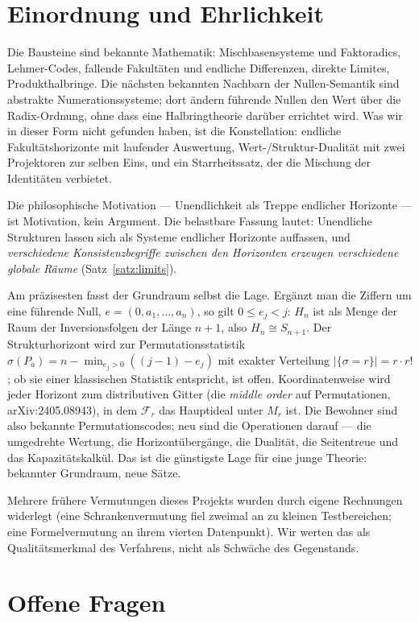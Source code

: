 \documentclass[11pt]{article}
\theoremstyle{definition}
\theoremstyle{remark}
\begin{document}
\section{Einordnung und Ehrlichkeit}

Die Bausteine sind bekannte Mathematik: Mischbasensysteme und
Faktoradics, Lehmer-Codes, fallende Fakultäten und endliche
Differenzen, direkte Limites, Produkthalbringe. Die nächsten
bekannten Nachbarn der Nullen-Semantik sind abstrakte
Numerationssysteme; dort ändern führende Nullen den Wert über die
Radix-Ordnung, ohne dass eine Halbringtheorie darüber errichtet
wird. Was wir in dieser Form nicht gefunden haben, ist die
Konstellation: endliche Fakultätshorizonte mit laufender Auswertung,
Wert-/Struktur-Dualität mit zwei Projektoren zur selben Eins, und
ein Starrheitssatz, der die Mischung der Identitäten verbietet.

Die philosophische Motivation --- Unendlichkeit als Treppe endlicher
Horizonte --- ist Motivation, kein Argument. Die belastbare Fassung
lautet: Unendliche Strukturen lassen sich als Systeme endlicher
Horizonte auffassen, und \emph{verschiedene Konsistenzbegriffe
zwischen den Horizonten erzeugen verschiedene globale Räume}
(Satz~\ref{satz:limits}).

Am präzisesten fasst der Grundraum selbst die Lage. Ergänzt man die
Ziffern um eine führende Null, $e=(0,a_1,\dots,a_n)$, so gilt
$0\le e_j<j$: $H_n$ ist als Menge der Raum der Inversionsfolgen der
Länge $n{+}1$, also $H_n\cong S_{n+1}$. Der Strukturhorizont wird
zur Permutationsstatistik
$\sigma(P_a)=n-\min_{e_j>0}((j{-}1)-e_j)$ mit exakter Verteilung
$|\{\sigma=r\}|=r\cdot r!$; ob sie einer klassischen Statistik
entspricht, ist offen. Koordinatenweise wird jeder Horizont zum
distributiven Gitter (die \emph{middle order} auf Permutationen,
arXiv:2405.08943), in dem $\mathcal F_r$ das Hauptideal unter $M_r$
ist. Die Bewohner sind also bekannte Permutationscodes; neu sind die
Operationen darauf --- die umgedrehte Wertung, die Horizontübergänge,
die Dualität, die Seitentreue und das Kapazitätskalkül. Das ist die
günstigste Lage für eine junge Theorie: bekannter Grundraum, neue
Sätze.

Mehrere frühere Vermutungen dieses Projekts wurden durch eigene
Rechnungen widerlegt (eine Schrankenvermutung fiel zweimal an zu
kleinen Testbereichen; eine Formelvermutung an ihrem vierten
Datenpunkt). Wir werten das als Qualitätsmerkmal des Verfahrens,
nicht als Schwäche des Gegenstands.

\section{Offene Fragen}
\end{document}
